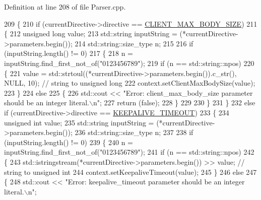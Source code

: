 Definition at line 208 of file Parser.\+cpp.


\begin{DoxyCode}
209     \{
210         \textcolor{keywordflow}{if} (currentDirective->directive == \hyperlink{namespaceft_a5a5554dff10f0dc50bae4cc5825ad75da026a7fa9f276b046081164564a62a6d6}{CLIENT\_MAX\_BODY\_SIZE})
211         \{
212             \textcolor{keywordtype}{unsigned} \textcolor{keywordtype}{long}       value;
213             std::string     inputString = (*currentDirective->parameters.begin());
214             std::string::size\_type  n;
215 
216             \textcolor{keywordflow}{if} (inputString.length() != 0)
217             \{
218                 n = inputString.find\_first\_not\_of(\textcolor{stringliteral}{"0123456789"});
219                 \textcolor{keywordflow}{if} (n == std::string::npos)
220                 \{   
221                     value = std::strtoul((*currentDirective->parameters.begin()).c\_str(), NULL, 10); \textcolor{comment}{//
       string to unsigned long}
222                     context.setClientMaxBodySize(value); 
223                 \}
224                 \textcolor{keywordflow}{else}
225                 \{
226                     std::cout << \textcolor{stringliteral}{"Error: client\_max\_body\_size parameter should be an integer literal.\(\backslash\)n"};
227                     \textcolor{keywordflow}{return} (\textcolor{keyword}{false});
228                 \}
229 
230             \}
231         \}
232         \textcolor{keywordflow}{else} \textcolor{keywordflow}{if} (currentDirective->directive == \hyperlink{namespaceft_a5a5554dff10f0dc50bae4cc5825ad75daaefe179bd74ff161beb62eb565186d89}{KEEPALIVE\_TIMEOUT})
233         \{
234             \textcolor{keywordtype}{unsigned} \textcolor{keywordtype}{int}        value;
235             std::string     inputString = (*currentDirective->parameters.begin());
236             std::string::size\_type  n;
237 
238             \textcolor{keywordflow}{if} (inputString.length() != 0)
239             \{
240                 n = inputString.find\_first\_not\_of(\textcolor{stringliteral}{"0123456789"});
241                 \textcolor{keywordflow}{if} (n == std::string::npos)
242                 \{   
243                     std::istringstream(*currentDirective->parameters.begin()) >> value; \textcolor{comment}{// string to
       unsigned int}
244                     context.setKeepaliveTimeout(value); 
245                 \}
246                 \textcolor{keywordflow}{else}
247                 \{
248                     std::cout << \textcolor{stringliteral}{"Error: keepalive\_timeout parameter should be an integer literal.\(\backslash\)n"};

\end{DoxyCode}
